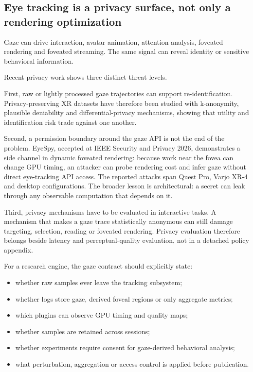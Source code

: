 \subsection{Eye tracking is a privacy surface, not only a rendering optimization}\label{04-visual-computing-ii-ch035-eye-tracking-is-a-privacy-surface-not-only-a-rendering-optimization}

Gaze can drive interaction, avatar animation, attention analysis, foveated rendering and foveated streaming. The same signal can reveal identity or sensitive behavioral information.

Recent privacy work shows three distinct threat levels.

First, raw or lightly processed gaze trajectories can support re-identification. Privacy-preserving XR datasets have therefore been studied with k-anonymity, plausible deniability and differential-privacy mechanisms, showing that utility and identification risk trade against one another.

Second, a permission boundary around the gaze API is not the end of the problem. EyeSpy, accepted at IEEE Security and Privacy 2026, demonstrates a side channel in dynamic foveated rendering: because work near the fovea can change GPU timing, an attacker can probe rendering cost and infer gaze without direct eye-tracking API access. The reported attacks span Quest Pro, Varjo XR-4 and desktop configurations. The broader lesson is architectural: a secret can leak through any observable computation that depends on it.

Third, privacy mechanisms have to be evaluated in interactive tasks. A mechanism that makes a gaze trace statistically anonymous can still damage targeting, selection, reading or foveated rendering. Privacy evaluation therefore belongs beside latency and perceptual-quality evaluation, not in a detached policy appendix.

For a research engine, the gaze contract should explicitly state:

\begin{itemize}
\tightlist
\item
  whether raw samples ever leave the tracking subsystem;
\item
  whether logs store gaze, derived foveal regions or only aggregate metrics;
\item
  which plugins can observe GPU timing and quality maps;
\item
  whether samples are retained across sessions;
\item
  whether experiments require consent for gaze-derived behavioral analysis;
\item
  what perturbation, aggregation or access control is applied before publication.
\end{itemize}


